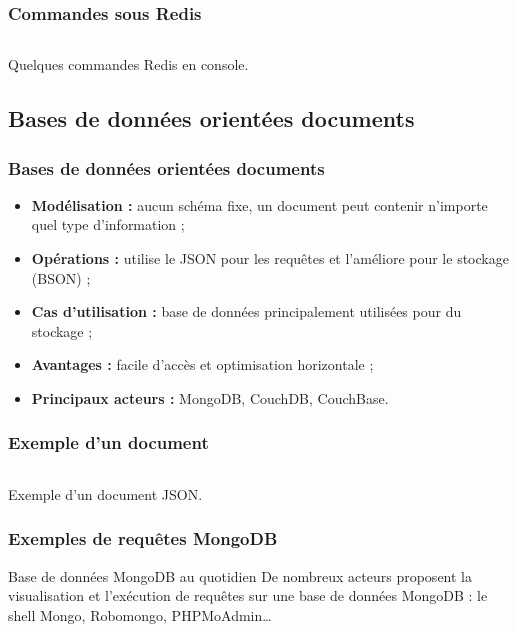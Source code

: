 	\begin{frame}
		\frametitle{Commandes sous Redis}

		\begin{listing}[H]
			\inputminted[fontsize=\tiny, linenos=true]{text}{code/commandesRedis.txt}
			\caption{Quelques commandes Redis en console.}
		\end{listing}

	\end{frame}

	\subsection{Bases de données orientées documents}
	\begin{frame}
		\frametitle{Bases de données orientées documents}

		\begin{itemize}
			\item \textbf{Modélisation :} aucun schéma fixe, un document peut contenir n'importe quel type d'information ;
			\item \textbf{Opérations :} utilise le JSON pour les requêtes et l'améliore pour le stockage (BSON) ;
			\item \textbf{Cas d'utilisation :} base de données principalement utilisées pour du stockage ;
			\item \textbf{Avantages :} facile d'accès et optimisation horizontale ;
			\item \textbf{Principaux acteurs :} MongoDB, CouchDB, CouchBase.
		\end{itemize}

	\end{frame}

	\begin{frame}
		\frametitle{Exemple d'un document}

		\begin{listing}[H]
			\inputminted[fontsize=\tiny, linenos=true]{json}{code/exemple-document.json}
			\caption{Exemple d'un document JSON.}
		\end{listing}
	\end{frame}

	\begin{frame}
		\frametitle{Exemples de requêtes MongoDB}


		\begin{exampleblock}{Base de données MongoDB au quotidien}
			De nombreux acteurs proposent la visualisation et l'exécution de requêtes sur une base de données MongoDB : le shell Mongo, Robomongo, PHPMoAdmin\dots 
		\end{exampleblock}


	\end{frame}


